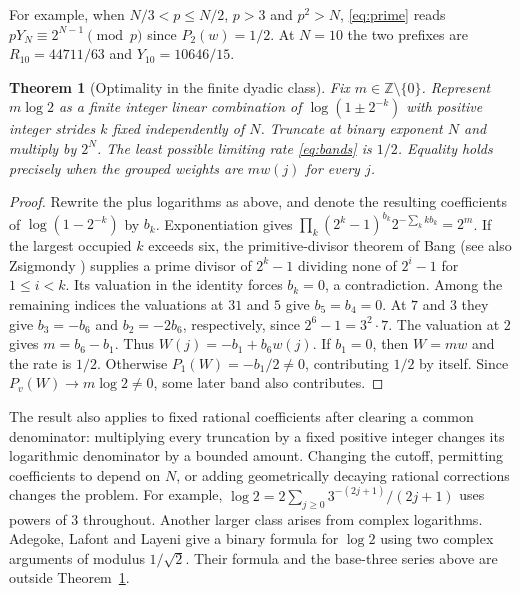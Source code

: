 \documentclass[11pt]{article}
\newtheorem{theorem}{Theorem}[section]
\newcommand{\Z}{\mathbb Z}
\begin{document}
For example, when $N/3<p\le N/2$, $p>3$ and $p^2>N$,
\eqref{eq:prime} reads $pY_N\equiv 2^{N-1}\pmod p$ since $P_2(w)=1/2$.
At $N=10$ the two prefixes are $R_{10}=44711/63$ and $Y_{10}=10646/15$.

\begin{theorem}[Optimality in the finite dyadic class]\label{th:optimal}
Fix $m\in\Z\setminus\{0\}$. Represent $m\log 2$ as a finite integer linear
combination of $\log(1\pm2^{-k})$ with positive integer strides $k$ fixed
independently of $N$. Truncate at binary exponent $N$ and multiply by $2^N$.
The least possible limiting rate \eqref{eq:bands} is $1/2$. Equality holds
precisely when the grouped weights are $m w(j)$ for every $j$.
\end{theorem}
\begin{proof}
Rewrite the plus logarithms as above, and denote the resulting coefficients
of $\log(1-2^{-k})$ by $b_k$. Exponentiation gives
$\prod_k(2^k-1)^{b_k}2^{-\sum_k k b_k}=2^m$.
If the largest occupied $k$ exceeds six, the primitive-divisor theorem of Bang \cite{bang} (see also Zsigmondy \cite{zsigmondy}) supplies
a prime divisor of $2^k-1$ dividing none of $2^i-1$ for $1\le i<k$.
Its valuation in the identity forces $b_k=0$, a contradiction. Among the
remaining indices the valuations at $31$ and $5$ give $b_5=b_4=0$.
At $7$ and $3$ they give $b_3=-b_6$ and $b_2=-2b_6$, respectively, since
$2^6-1=3^2\cdot7$. The valuation at $2$ gives $m=b_6-b_1$. Thus
$W(j)=-b_1+b_6 w(j)$. If $b_1=0$, then $W=m w$ and the rate is $1/2$.
Otherwise $P_1(W)=-b_1/2\ne0$, contributing $1/2$ by itself.
Since $P_v(W)\to m\log2\ne0$, some later band also contributes.
\end{proof}

The result also applies to fixed rational coefficients after clearing a common denominator: multiplying every truncation by a fixed positive integer changes its logarithmic denominator by a bounded amount.
Changing the cutoff, permitting coefficients to depend on $N$, or adding
geometrically decaying rational corrections changes the problem. For example,
$\log2=2\sum_{j\ge0}3^{-(2j+1)}/(2j+1)$ uses powers of $3$ throughout.
Another larger class arises from complex logarithms. Adegoke, Lafont and
Layeni \cite[eqs.~(28)--(29)]{adegoke} give a binary formula for $\log2$
using two complex arguments of modulus $1/\sqrt2$. Their formula and the
base-three series above are outside Theorem~\ref{th:optimal}.
\end{document}
